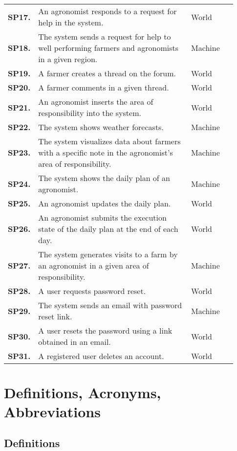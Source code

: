 \begin{longtable}{@{}p{0.06\linewidth} p{0.67\linewidth} p{0.20\linewidth}@{}}
    \textbf{SP17.} & An agronomist responds to a request for help in the system. & World \\
    \textbf{SP18.} & The system sends a request for help to well performing farmers and agronomists in a given region.  & Machine \\
    \textbf{SP19.} & A farmer creates a thread on the forum.  & World \\
    \textbf{SP20.} & A farmer comments in a given thread. & World \\
    \textbf{SP21.} & An agronomist inserts the area of responsibility into the system. & World \\
    \textbf{SP22.} & The system shows weather forecasts. & Machine \\
    \textbf{SP23.} & The system visualizes data about farmers with a specific note in the agronomist's area of responsibility. & Machine \\
    \textbf{SP24.} & The system shows the daily plan of an agronomist. & Machine \\
    \textbf{SP25.} & An agronomist updates the daily plan. & World \\
    \textbf{SP26.} & An agronomist submits the execution state of the daily plan at the end of each day. & World \\
    \textbf{SP27.} & The system generates visits to a farm by an agronomist in a given area of responsibility. & Machine \\
    \textbf{SP28.} & A user requests password reset. & World \\
    \textbf{SP29.} & The system sends an email with password reset link. & Machine \\
    \textbf{SP30.} & A user resets the password using a link obtained in an email. & World \\
    \textbf{SP31.} & A registered user deletes an account. & World \\
	\bottomrule
\end{longtable}

\section{Definitions, Acronyms, Abbreviations}

\subsection{Definitions}

